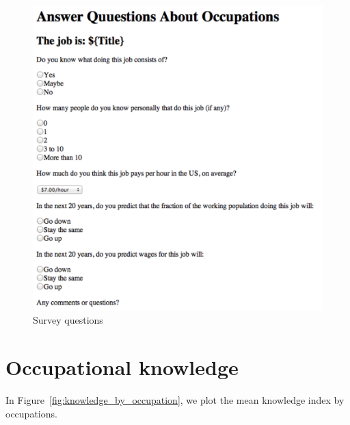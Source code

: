 \documentclass[11pt]{article}
\begin{document}
\begin{figure}
\caption{Survey questions \label{fig:survey}}
\begin{minipage}{0.95 \linewidth}
\includegraphics[width = \linewidth]{./images/survey.png}
\end{minipage}  
\end{figure} 

\section{Occupational knowledge} 
In Figure~\ref{fig:knowledge_by_occupation}, we plot the mean knowledge index by occupations.  
\end{document}
